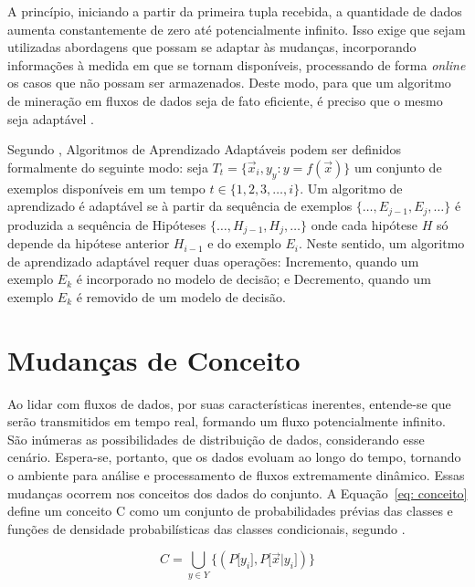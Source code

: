 A princípio, iniciando a partir da primeira tupla recebida, a quantidade de dados aumenta constantemente de zero até potencialmente infinito. Isso exige que sejam utilizadas abordagens que possam se adaptar às mudanças, incorporando informações à medida em que se tornam disponíveis, processando de forma \textit{online} os casos que não possam ser armazenados. Deste modo, para que um algoritmo de mineração em fluxos de dados seja de fato eficiente, é preciso que o mesmo seja adaptável \cite{Krempl2014}.

Segundo 
, 
Algoritmos de Aprendizado Adaptáveis podem ser definidos formalmente do seguinte modo: seja $T_{t} = \{\vec{x}_{i},y_{y} : y = f(\vec{x}) \}$ um conjunto de exemplos disponíveis em um tempo $t \in \{1, 2, 3, \ldots, i\}$. Um algoritmo de aprendizado é adaptável se à partir da sequência de exemplos $\{\ldots, E_{j-1}, E_{j}, \ldots\}$ 
é produzida a sequência de Hipóteses $\{\ldots, H_{j-1}, H_{j}, \ldots\}$ onde cada hipótese $H$ só depende da hipótese anterior $H_{i-1}$ e do exemplo $E_i$. Neste sentido, um algoritmo de aprendizado adaptável requer duas operações: Incremento, quando um exemplo $E_k$ é incorporado no modelo de decisão; e Decremento, quando um exemplo $E_k$ é removido de um modelo de decisão.



\section{Mudanças de Conceito}\label{sec:concept_drift} 

Ao lidar com fluxos de dados, por suas características inerentes, entende-se que serão transmitidos em tempo real, formando um fluxo potencialmente infinito. São inúmeras as possibilidades de distribuição de dados, considerando esse cenário. Espera-se, portanto, que os dados evoluam ao longo do tempo, tornando o ambiente para análise e processamento de fluxos extremamente dinâmico. Essas mudanças ocorrem nos conceitos dos dados do conjunto. A Equação~\ref{eq: conceito} define um conceito C como um conjunto de probabilidades prévias das classes e funções de densidade probabilísticas das classes condicionais, segundo .

\begin{equation}
C =   \underset{y\in Y}{\bigcup} \big\{( P\big[ y_i \big],  P\big[ \vec{x} \vert  y_i \big]) \big\}
\label{eq: conceito}
\end{equation}

